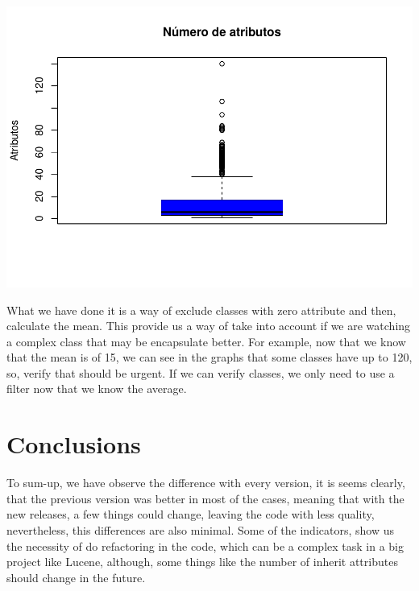 \documentclass[
]{article}
\begin{document}
\includegraphics{report_files/figure-latex/unnamed-chunk-10-3.pdf}

What we have done it is a way of exclude classes with zero attribute and
then, calculate the mean. This provide us a way of take into account if
we are watching a complex class that may be encapsulate better. For
example, now that we know that the mean is of 15, we can see in the
graphs that some classes have up to 120, so, verify that should be
urgent. If we can verify classes, we only need to use a filter now that
we know the average.

\hypertarget{conclusions}{%
\section{Conclusions}\label{conclusions}}

To sum-up, we have observe the difference with every version, it is
seems clearly, that the previous version was better in most of the
cases, meaning that with the new releases, a few things could change,
leaving the code with less quality, nevertheless, this differences are
also minimal. Some of the indicators, show us the necessity of do
refactoring in the code, which can be a complex task in a big project
like Lucene, although, some things like the number of inherit attributes
should change in the future.
\end{document}
